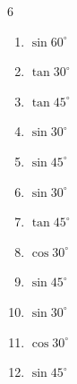 \begin{multicols}{6}
\begin{enumerate}

  \item $\displaystyle \sin{60^\circ}$


  \item $\displaystyle \tan{30^\circ}$


  \item $\displaystyle \tan{45^\circ}$

        \phantom{$\displaystyle =1$}

  \item $\displaystyle \sin{30^\circ}$


  \item $\displaystyle \sin{45^\circ}$


  \item $\displaystyle \sin{30^\circ}$


  \item $\displaystyle \tan{45^\circ}$

        \phantom{$\displaystyle =1$}

  \item $\displaystyle \cos{30^\circ}$


  \item $\displaystyle \sin{45^\circ}$


  \item $\displaystyle \sin{30^\circ}$


  \item $\displaystyle \cos{30^\circ}$


  \item $\displaystyle \sin{45^\circ}$



\end{enumerate}
\end{multicols}
